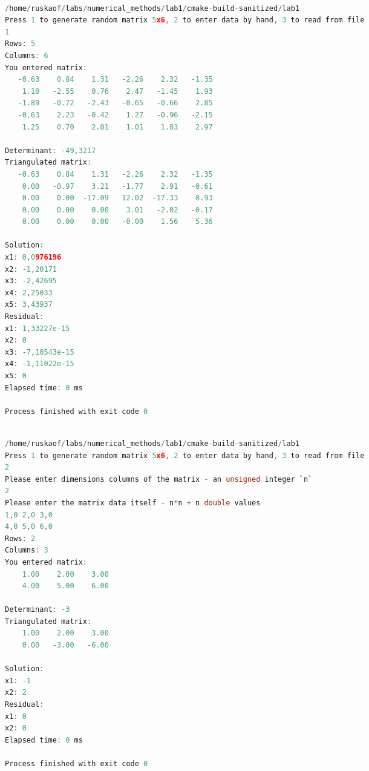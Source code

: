 \documentclass[12pt]{article}
\begin{document}
\begin{adjustbox}{width=\textwidth, center}
\begin{lstlisting}[language=C++, caption=Случайная генерация матрицы]

/home/ruskaof/labs/numerical_methods/lab1/cmake-build-sanitized/lab1
Press 1 to generate random matrix 5x6, 2 to enter data by hand, 3 to read from file
1
Rows: 5
Columns: 6
You entered matrix:
   -0.63    0.84    1.31   -2.26    2.32   -1.35
    1.18   -2.55    0.76    2.47   -1.45    1.93
   -1.89   -0.72   -2.43   -0.65   -0.66    2.85
   -0.63    2.23   -0.42    1.27   -0.96   -2.15
    1.25    0.70    2.01    1.01    1.83    2.97

Determinant: -49,3217
Triangulated matrix:
   -0.63    0.84    1.31   -2.26    2.32   -1.35
    0.00   -0.97    3.21   -1.77    2.91   -0.61
    0.00    0.00  -17.09   12.02  -17.33    8.93
    0.00    0.00    0.00    3.01   -2.02   -0.17
    0.00    0.00    0.00   -0.00    1.56    5.36

Solution:
x1: 0,0976196
x2: -1,20171
x3: -2,42695
x4: 2,25033
x5: 3,43937
Residual:
x1: 1,33227e-15
x2: 0
x3: -7,10543e-15
x4: -1,11022e-15
x5: 0
Elapsed time: 0 ms

Process finished with exit code 0


\end{lstlisting}
\end{adjustbox}

\begin{adjustbox}{width=\textwidth, center}
\begin{lstlisting}[language=C++, caption=Ручной ввод]

/home/ruskaof/labs/numerical_methods/lab1/cmake-build-sanitized/lab1
Press 1 to generate random matrix 5x6, 2 to enter data by hand, 3 to read from file
2
Please enter dimensions columns of the matrix - an unsigned integer `n`
2
Please enter the matrix data itself - n*n + n double values
1,0 2,0 3,0
4,0 5,0 6,0
Rows: 2
Columns: 3
You entered matrix:
    1.00    2.00    3.00
    4.00    5.00    6.00

Determinant: -3
Triangulated matrix:
    1.00    2.00    3.00
    0.00   -3.00   -6.00

Solution:
x1: -1
x2: 2
Residual:
x1: 0
x2: 0
Elapsed time: 0 ms

Process finished with exit code 0


\end{lstlisting}
\end{adjustbox}
\end{document}
